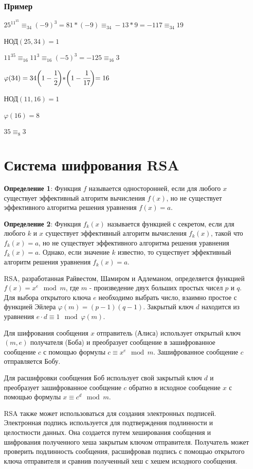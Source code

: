 \documentclass[12pt]{article}
\begin{document}
\subsubsection{Пример}
$25^{11^{35}}\equiv_{34}(-9)^{3}=81*(-9)\equiv_{34}-13*9=-117\equiv_{34}19$
\par НОД$(25,34)=1$
\par $11^{35}\equiv_{16}11^{3}\equiv_{16}(-5)^{3}=-125\equiv_{16}3$
\par $\varphi(34)=34\biggl(1-\cfrac{1}{2}\biggl)*\biggl(1-\cfrac{1}{17}\biggl)=16$
\par НОД$(11,16)=1$
\par $\varphi(16)=8$
\par $35\equiv_{8}3$

\section{Система шифрования RSA}

\textbf{Определение 1}: Функция $f$ называется односторонней, если для любого $x$ существует эффективный алгоритм вычисления $f(x)$, но не существует эффективного алгоритма решения уравнения $f(x) = a$.

\textbf{Определение 2}: Функция $f_k(x)$ называется функцией с секретом, если для любого $k$ и $x$ существует эффективный алгоритм вычисления $f_k(x)$, такой что $f_k(x) = a$, но не существует эффективного алгоритма решения уравнения $f_k(x) = a$. Однако, если значение $k$ известно, то существует эффективный алгоритм решения уравнения $f_k(x) = a$.

RSA, разработанная Райвестом, Шамиром и Адлеманом, определяется функцией $f(x) = x^e \mod m$, где $m$ - произведение двух больших простых чисел $p$ и $q$. Для выбора открытого ключа $e$ необходимо выбрать число, взаимно простое с функцией Эйлера $\varphi(m) = (p-1)(q-1)$. Закрытый ключ $d$ находится из уравнения $e \cdot d \equiv 1 \mod \varphi(m)$.

Для шифрования сообщения $x$ отправитель (Алиса) использует открытый ключ $(m,e)$ получателя (Боба) и преобразует сообщение в зашифрованное сообщение $c$ с помощью формулы $c \equiv x^e \mod m$. Зашифрованное сообщение $c$ отправляется Бобу.

Для расшифровки сообщения Боб использует свой закрытый ключ $d$ и преобразует зашифрованное сообщение $c$ обратно в исходное сообщение $x$ с помощью формулы $x \equiv c^d \mod m$.

RSA также может использоваться для создания электронных подписей. Электронная подпись используется для подтверждения подлинности и целостности данных. Она создается путем хеширования сообщения и шифрования полученного хеша закрытым ключом отправителя. Получатель может проверить подлинность сообщения, расшифровав подпись с помощью открытого ключа отправителя и сравнив полученный хеш с хешем исходного сообщения.
\end{document}
